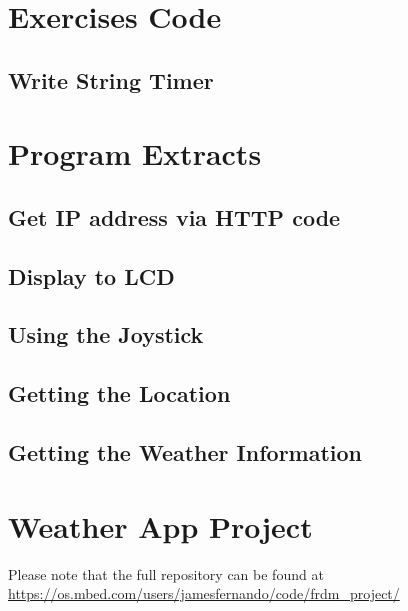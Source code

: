 \begin{appendices}
	\label{Appendix:start}
	\section{Exercises Code}
	{
		\subsection{Write String Timer}
		{
		\label{appendix:write-string-timer}
		
		}
	}
	\section{Program Extracts}{
		\subsection{Get IP address via HTTP code}
		{

			\label{appendix:get-IP-Address-Via-HTTP}
			
		}
		\subsection{Display to LCD}
		{

			\label{appendix:display-to-LCD}
			
		}
		\subsection{Using the Joystick}
		{

			\label{appendix:use-joystick}
			
		}
		\subsection{Getting the Location}
		{

			\label{appendix:get-location}
			
		}
		\subsection{Getting the Weather Information}
		{

			\label{appendix:get-weather-info}
			
		}
		
	}
	\section{Weather App Project}
	{
		Please note that the full repository can be found at \url{https://os.mbed.com/users/jamesfernando/code/frdm_project/}
		\label{appendix:Weather-app-project}
		
	}
\end{appendices}